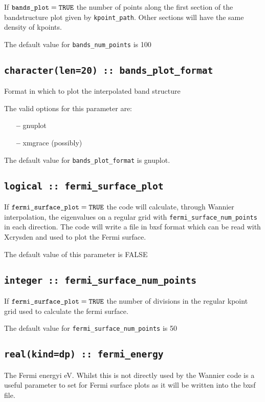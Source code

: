 If $\verb#bands_plot#=\verb#TRUE#$ the number of points along the first
section of the bandstructure plot given by \verb#kpoint_path#. Other
sections will have the same density of kpoints.

The default value for \verb#bands_num_points# is 100


\subsection[bands\_plot\_format]{\tt character(len=20) :: bands\_plot\_format}

Format in which to plot the interpolated band structure

The valid options for this parameter are:
\begin{itemize}
\item[{\bf --}] gnuplot
\item[{\bf --}] xmgrace (possibly)
\end{itemize}

The default value for \verb#bands_plot_format# is gnuplot.


\subsection[fermi\_surface\_plot]{\tt logical :: fermi\_surface\_plot}

If $\verb#fermi_surface_plot#=\verb#TRUE#$ the code will calculate,
through Wannier interpolation, the
eigenvalues on a regular grid with \verb#fermi_surface_num_points# in
each direction. The code will write a file in bxsf format which can be
read with Xcrysden and used to plot the Fermi surface.

The default value of this parameter is FALSE


\subsection[fermi\_surface\_num\_points]{\tt integer :: fermi\_surface\_num\_points}

If $\verb#fermi_surface_plot#=\verb#TRUE#$ the number of divisions in
the regular kpoint grid used to calculate the fermi surface.

The default value for \verb#fermi_surface_num_points# is 50


\subsection[fermi\_energy]{\tt real(kind=dp) :: fermi\_energy}
The Fermi energyi eV. Whilst this is not directly used by the Wannier 
code is a useful parameter to set for Fermi surface plots as
it will be written into the bxsf file.

